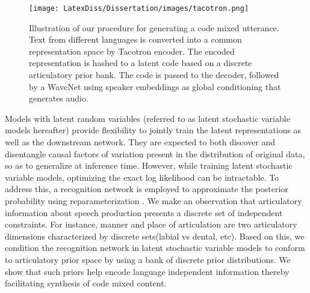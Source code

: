 \begin{figure}[t]
\centering
\texttt{[image: LatexDiss/Dissertation/images/tacotron.png]}
\caption{ Illustration of our procedure for generating a code mixed utterance. Text from different languages is converted into a common representation space by Tacotron encoder. The encoded representation is hashed to a latent code based on a discrete articulatory prior bank. The code is passed to the decoder, followed by a WaveNet using speaker embeddings as global conditioning that generates audio. } 
\label{overview_figure}
\end{figure}  

Models with latent random variables (referred to as latent stochastic variable models hereafter)  provide flexibility to jointly train the latent representations as well as the downstream  network. They are expected to both discover and disentangle causal factors of variation present in the distribution of original data, so as to generalize at inference time. However, while training latent stochastic variable models, optimizing the exact log likelihood can be intractable. To address this, a recognition network is employed to approximate the posterior probability using reparameterization \cite{kingma_vae}. We make an observation that articulatory information about speech production presents a discrete set of independent constraints. For instance, manner and place of articulation are two articulatory dimensions characterized by discrete sets(labial vs dental, etc). Based on this, we condition the recognition network in latent stochastic variable models to conform to articulatory prior space by using a bank of discrete prior distributions. We show that such priors help encode language independent information thereby facilitating synthesis of code mixed content.  



